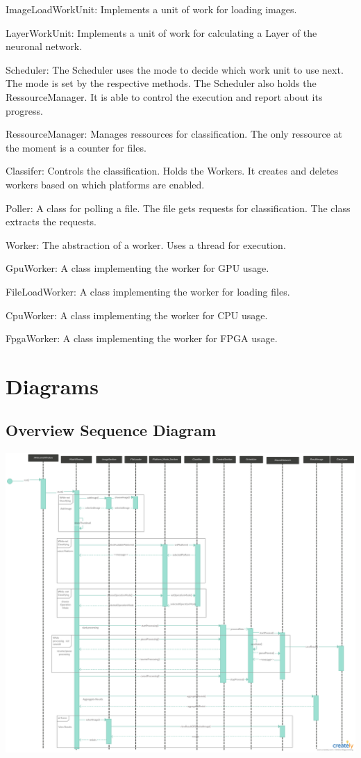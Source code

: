 \documentclass[parskip=full]{scrartcl}
\begin{document}
ImageLoadWorkUnit: Implements a unit of work for loading images.

LayerWorkUnit: Implements a unit of work for calculating a Layer of the neuronal network.

Scheduler: The Scheduler uses the mode to decide which work unit to use next. The mode is set by the respective methods. The Scheduler also holds the RessourceManager. It is able to control the execution and report about its progress.

RessourceManager: Manages ressources for classification. The only ressource at the moment is a counter for files.

Classifer: Controls the classification. Holds the Workers. It creates and deletes workers based on which platforms are enabled.

Poller: A class for polling a file. The file gets requests for classification. The class extracts the requests.

Worker: The abstraction of a worker. Uses a thread for execution.

GpuWorker: A class implementing the worker for GPU usage.

FileLoadWorker: A class implementing the worker for loading files.

CpuWorker: A class implementing the worker for CPU usage.

FpgaWorker: A class implementing the worker for FPGA usage.



\pagebreak

\section {Diagrams}

\subsection {Overview Sequence Diagram}

\begin{center}
\includegraphics[width=1.0\textwidth]{seq.png}
\end{center}
\end{document}
